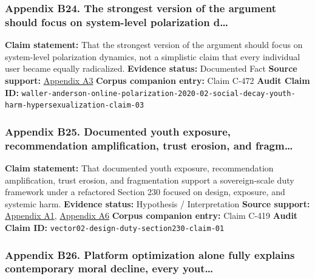 \documentclass[
  american,
  11pt,
  letterpaper,
]{article}
\begin{document}
\subsubsection{Appendix B24. The strongest version of the argument
should focus on system-level polarization
d\ldots{}}\label{ch-02-appendix-b24-the-strongest-version-of-the-argument-should-focus-on-system-level-polarization-d}

\textbf{Claim statement:} That the strongest version of the argument
should focus on system-level polarization dynamics, not a simplistic
claim that every individual user became equally radicalized.
\textbf{Evidence status:} Documented Fact \textbf{Source support:}
\hyperref[ch-02-appendix-a3-quantifying-social-organization-and-political-polarization-in-online-platforms]{Appendix
A3} \textbf{Corpus companion entry:} Claim C-472 \textbf{Audit Claim
ID:}
\texttt{waller-anderson-online-polarization-2020-02-social-decay-youth-harm-hypersexualization-claim-03}

\subsubsection{Appendix B25. Documented youth exposure, recommendation
amplification, trust erosion, and
fragm\ldots{}}\label{ch-02-appendix-b25-documented-youth-exposure-recommendation-amplification-trust-erosion-and-fragm}

\textbf{Claim statement:} That documented youth exposure, recommendation
amplification, trust erosion, and fragmentation support a
sovereign-scale duty framework under a refactored Section 230 focused on
design, exposure, and systemic harm. \textbf{Evidence status:}
Hypothesis / Interpretation \textbf{Source support:}
\hyperref[ch-02-appendix-a1-social-media-and-youth-mental-health-the-u-s-surgeon-general-s-advisory]{Appendix
A1},
\hyperref[ch-02-appendix-a6-social-media-seen-as-mostly-good-for-democracy-across-many-nations-but-u-s-is-a-major-outlier]{Appendix
A6} \textbf{Corpus companion entry:} Claim C-419 \textbf{Audit Claim
ID:} \texttt{vector02-design-duty-section230-claim-01}

\subsubsection{Appendix B26. Platform optimization alone fully explains
contemporary moral decline, every
yout\ldots{}}\label{ch-02-appendix-b26-platform-optimization-alone-fully-explains-contemporary-moral-decline-every-yout}
\end{document}
